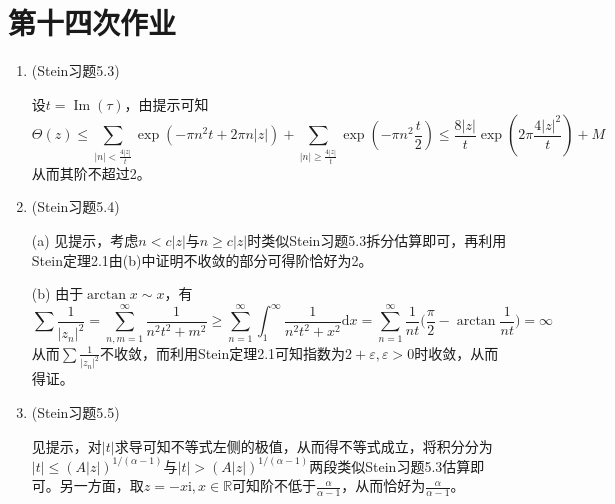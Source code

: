 \documentclass[a4paper,UTF8,fontset=windows]{ctexart}
\DeclareMathOperator{\im}{Im}
\begin{document}
\section{第十四次作业}
\begin{enumerate}
    \item (Stein习题5.3)
    
    设$t=\im(\tau)$，由提示可知
    \[\Theta(z)\le\sum_{|n|<\frac{4|z|}{t}}\exp(-\pi n^2t+2\pi n|z|)+\sum_{|n|\ge\frac{4|z|}{t}}\exp(-\pi n^2\frac{t}{2})\le\frac{8|z|}{t}\exp(2\pi\frac{4|z|^2}{t})+M\]
    从而其阶不超过2。
    
    \item (Stein习题5.4)
    
    (a) 见提示，考虑$n<c|z|$与$n\ge c|z|$时类似Stein习题5.3拆分估算即可，再利用Stein定理2.1由(b)中证明不收敛的部分可得阶恰好为2。
    
    (b) 由于$\arctan x\sim x$，有
    \[\sum\frac{1}{|z_n|^2}=\sum_{n,m=1}^\infty\frac{1}{n^2t^2+m^2}\ge\sum_{n=1}^\infty\int_1^\infty\frac{1}{n^2t^2+x^2}\mathrm{d}x=\sum_{n=1}^\infty\frac{1}{nt}\bigg(\frac{\pi}{2}-\arctan\frac{1}{nt}\bigg)=\infty\]
    从而$\sum\frac{1}{|z_n|^2}$不收敛，而利用Stein定理2.1可知指数为$2+\varepsilon,\varepsilon>0$时收敛，从而得证。
    
    \item (Stein习题5.5)
    
    见提示，对$|t|$求导可知不等式左侧的极值，从而得不等式成立，将积分分为$|t|\le(A|z|)^{1/(\alpha-1)}$与$|t|>(A|z|)^{1/(\alpha-1)}$两段类似Stein习题5.3估算即可。另一方面，取$z=-x\mathrm{i},x\in\mathbb{R}$可知阶不低于$\frac{\alpha}{\alpha-1}$，从而恰好为$\frac{\alpha}{\alpha-1}$。
\end{enumerate}
\end{document}
